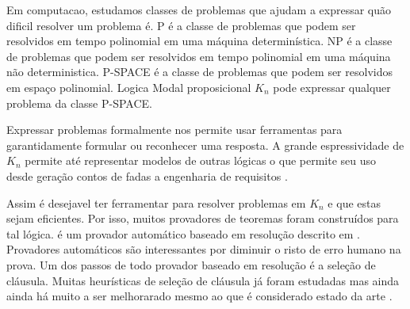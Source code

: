 





Em computacao, estudamos classes de problemas que ajudam a expressar quão dificil resolver um problema é. P é a classe de problemas que podem ser resolvidos em tempo polinomial em uma máquina determinística. NP é a classe de problemas que podem ser resolvidos em tempo polinomial em uma máquina não deterministica. P-SPACE é a classe de problemas que podem ser resolvidos em espaço polinomial. %
Logica Modal proposicional $K_n$ pode expressar qualquer problema da classe P-SPACE. %

Expressar problemas formalmente nos permite usar ferramentas para garantidamente formular ou reconhecer uma resposta.
A grande espressividade de $K_n$ permite até representar modelos de outras lógicas \cite{correspkn} o que permite seu uso desde geração contos de fadas\cite{fairytale} a engenharia de requisitos \cite{reqeng}.

Assim é desejavel ter ferramentar para resolver problemas em $K_n$ e que estas sejam eficientes. Por isso, muitos provadores de teoremas foram construídos para tal lógica. \ksp é um provador automático baseado em resolução descrito em \cite{Nalon2020}. Provadores automáticos são interessantes por diminuir o risto de erro humano na prova. Um dos passos de todo provador baseado em resolução é a seleção de cláusula. Muitas heurísticas de seleção de cláusula já foram estudadas mas ainda ainda há muito a ser melhorarado mesmo ao que é considerado estado da arte \cite{stephan}.

